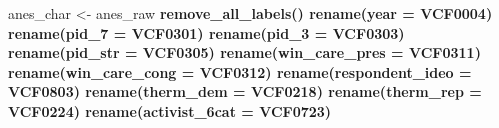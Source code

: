 \documentclass[
]{article}
\newenvironment{Shaded}{\begin{snugshade}}{\end{snugshade}}
\newcommand{\CommentTok}[1]{\textcolor[rgb]{0.56,0.35,0.01}{\textit{#1}}}
\newcommand{\DataTypeTok}[1]{\textcolor[rgb]{0.13,0.29,0.53}{#1}}
\newcommand{\KeywordTok}[1]{\textcolor[rgb]{0.13,0.29,0.53}{\textbf{#1}}}
\newcommand{\NormalTok}[1]{#1}
\newcommand{\OperatorTok}[1]{\textcolor[rgb]{0.81,0.36,0.00}{\textbf{#1}}}
\newcommand{\StringTok}[1]{\textcolor[rgb]{0.31,0.60,0.02}{#1}}
\begin{document}
\begin{Shaded}
\begin{Highlighting}[]
\NormalTok{anes_char <-}\StringTok{ }\NormalTok{anes_raw }\OperatorTok{%>%}
\StringTok{    }\KeywordTok{remove_all_labels}\NormalTok{()}\OperatorTok{%>%}
\StringTok{    }\KeywordTok{rename}\NormalTok{(}\DataTypeTok{year =}\NormalTok{ VCF0004)}\OperatorTok{%>%}\StringTok{ }\CommentTok{# Year of response}
\StringTok{    }\KeywordTok{rename}\NormalTok{(}\DataTypeTok{pid_7 =}\NormalTok{ VCF0301)}\OperatorTok{%>%}\StringTok{ }\CommentTok{#7 scale Party ID val: 1-7. Strong Democrat 2. Weak Democrat3. Independent - Democrat4. Independent - Independent5. Independent - Republican6. Weak Republican7. Strong Republican}
\StringTok{    }\KeywordTok{rename}\NormalTok{(}\DataTypeTok{pid_3 =}\NormalTok{ VCF0303)}\OperatorTok{%>%}\StringTok{ }\CommentTok{# Party ID 3 categories val: "Republican", "Independent", "Democrat" (Dem/Rep include Leaners)}
\StringTok{    }\KeywordTok{rename}\NormalTok{(}\DataTypeTok{pid_str =}\NormalTok{ VCF0305)}\OperatorTok{%>%}\StringTok{ }\CommentTok{# PID strength val: 1. Independent 2. Leaning Independent 3. Weak Partisan 4. Strong Partisan Kept this because I wanted to create basically this variable later}
\StringTok{    }\KeywordTok{rename}\NormalTok{(}\DataTypeTok{win_care_pres =}\NormalTok{ VCF0311)}\OperatorTok{%>%}\StringTok{ }\CommentTok{# How much do you care which party wins presidency? val: 1. Don't care very much or DK, pro-con, depends, and other, 2. Care a great deal}
\StringTok{    }\KeywordTok{rename}\NormalTok{(}\DataTypeTok{win_care_cong =}\NormalTok{ VCF0312)}\OperatorTok{%>%}\StringTok{ }\CommentTok{# How much do you care which party wins congress? val: 1. Don't care very much or DK, pro-con, depends, and other, 2. Care a great deal notes: only asked through 2008}
\StringTok{    }\KeywordTok{rename}\NormalTok{(}\DataTypeTok{respondent_ideo =}\NormalTok{ VCF0803)}\OperatorTok{%>%}\StringTok{ }\CommentTok{# Liberal-conservative scale val: 1(extremely liberal)- 7(extremely conservative) 9. DK; haven't much thought about it}
\StringTok{    }\KeywordTok{rename}\NormalTok{(}\DataTypeTok{therm_dem =}\NormalTok{ VCF0218)}\OperatorTok{%>%}\StringTok{ }\CommentTok{# val 00-96 cold-warm as coded; 97: 97-100, 98: DK, 99. NA}
\StringTok{    }\KeywordTok{rename}\NormalTok{(}\DataTypeTok{therm_rep =}\NormalTok{ VCF0224)}\OperatorTok{%>%}\StringTok{ }\CommentTok{# val 00-96 cold-warm as coded; 97: 97-100, 98: DK, 99. NA}
\StringTok{    }\KeywordTok{rename}\NormalTok{(}\DataTypeTok{activist_6cat =}\NormalTok{ VCF0723)}\OperatorTok{%>%}\CommentTok{#val: 1-6 low-high participation 0. DKN/NA}
}}}}}}}}}}}}
\end{Highlighting}
\end{Shaded}
\end{document}
